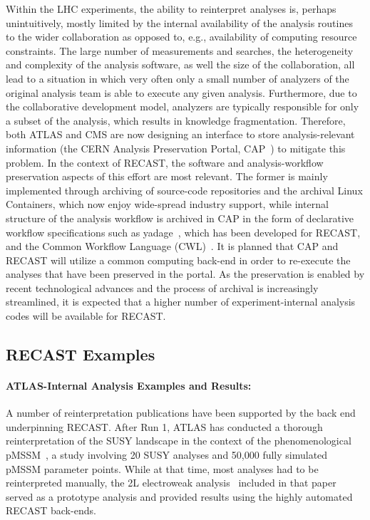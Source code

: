 Within the LHC experiments, the ability to reinterpret analyses is, perhaps unintuitively, mostly limited by the internal availability of the analysis routines to the wider collaboration as opposed to, e.g., availability of computing resource constraints. The large number of measurements and searches, the heterogeneity and complexity of the analysis software, as well the size of the collaboration, all lead to a situation in which very often only a small number of analyzers of the original analysis team is able to execute any given analysis. Furthermore, due to the collaborative development model, analyzers are typically responsible for only a subset of the analysis, which results in knowledge fragmentation. Therefore, both ATLAS and CMS are now designing an interface to store analysis-relevant information (the CERN Analysis Preservation Portal, CAP~\cite{CAP}) to mitigate this problem. In the context of RECAST, the software and analysis-workflow preservation aspects of this effort are most relevant. The former is mainly implemented through archiving of source-code repositories and the archival Linux Containers, which now enjoy wide-spread industry support, while internal structure of the analysis workflow is archived in CAP in the form of declarative workflow specifications such as yadage~\cite{Cranmer:2017frf}, which has been developed for RECAST, and the Common Workflow Language (CWL)~\cite{CWL}. It is planned that CAP and RECAST will utilize a common computing back-end in order to re-execute the analyses that have been preserved in the portal. As the preservation is enabled by recent technological advances and the process of archival is increasingly streamlined, it is expected that a higher number of experiment-internal analysis codes will be available for RECAST.

\subsection{RECAST Examples}

\paragraph{ATLAS-Internal Analysis Examples and Results:}

A number of reinterpretation publications have been supported by the back end underpinning RECAST. After Run 1, ATLAS has conducted a thorough reinterpretation of the SUSY landscape in the context of the phenomenological pMSSM~\cite{Aad:2015baa}, a study involving 20 SUSY analyses and 50,000 fully simulated pMSSM parameter points. While at that time, most analyses had to be reinterpreted manually, the 2L electroweak analysis~\cite{Aad:2014vma} included in that paper served as a prototype analysis and provided results using the highly automated RECAST back-ends.

